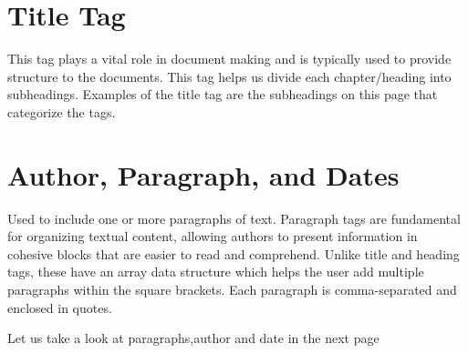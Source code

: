 \documentclass[oneside]{book}
\begin{document}
\section{Title Tag}
This tag plays a vital role in document making and is typically used to provide structure to the documents. This tag helps us divide each chapter/heading into subheadings.
        Examples of the title tag are the subheadings on this page that categorize the tags.\par
\section{Author, Paragraph, and Dates}
Used to include one or more paragraphs of text. Paragraph tags are fundamental for organizing textual content, allowing authors to present
        information in cohesive blocks that are easier to read and comprehend. Unlike title and heading tags, these have an array data structure which helps the user add multiple 
        paragraphs within the square brackets. Each paragraph is comma-separated and enclosed in quotes.\par
Let us take a look at paragraphs,author and date in the next page \par

\newpage
\end{document}
